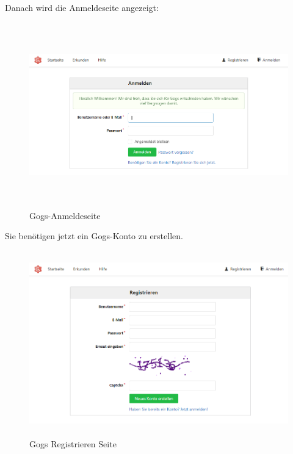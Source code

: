 \documentclass[a4paper,12pt,oneside]{book}
\begin{document}
Danach wird die Anmeldeseite angezeigt:
\begin{figure}[h!]
	\begin{center}
		\includegraphics[width=17cm, height=8cm]{anmeldeseite.PNG}
		\caption{Gogs-Anmeldeseite} 
		\label{Anmeldeseite} 
	\end{center}
\end{figure}
\newline
Sie benötigen jetzt ein Gogs-Konto zu erstellen.
\begin{figure}[h!]
	\begin{center}
		\includegraphics[width=17cm, height=8cm]{gogs-registrieren-seite.PNG}
		\caption{Gogs Registrieren Seite} 
		\label{Gogs Registrieren Seite} 
	\end{center}
\end{figure}
\end{document}
